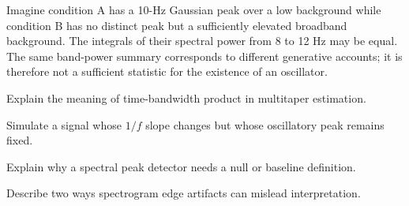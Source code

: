 \begin{workedexample}
Imagine condition A has a 10-Hz Gaussian peak over a low background while condition B has no distinct peak but a sufficiently elevated broadband background. The integrals of their spectral power from 8 to 12 Hz may be equal. The same band-power summary corresponds to different generative accounts; it is therefore not a sufficient statistic for the existence of an oscillator.
\end{workedexample}
\begin{exercises}
\item Explain the meaning of time-bandwidth product in multitaper estimation.
\item Simulate a signal whose $1/f$ slope changes but whose oscillatory peak remains fixed.
\item Explain why a spectral peak detector needs a null or baseline definition.
\item Describe two ways spectrogram edge artifacts can mislead interpretation.
\end{exercises}